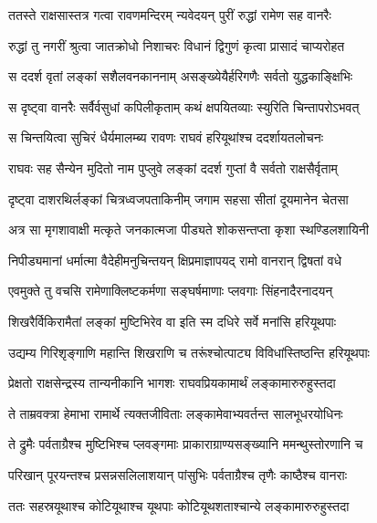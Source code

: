 
\twolineshloka
{ततस्ते राक्षसास्तत्र गत्वा रावणमन्दिरम्}
{न्यवेदयन् पुरीं रुद्धां रामेण सह वानरैः} %

\twolineshloka
{रुद्धां तु नगरीं श्रुत्वा जातक्रोधो निशाचरः}
{विधानं द्विगुणं कृत्वा प्रासादं चाप्यरोहत} %

\twolineshloka
{स ददर्श वृतां लङ्कां सशैलवनकाननाम्}
{असङ्ख्येयैर्हरिगणैः सर्वतो युद्धकाङ्क्षिभिः} %

\twolineshloka
{स दृष्ट्वा वानरैः सर्वैर्वसुधां कपिलीकृताम्}
{कथं क्षपयितव्याः स्युरिति चिन्तापरोऽभवत्} %

\twolineshloka
{स चिन्तयित्वा सुचिरं धैर्यमालम्ब्य रावणः}
{राघवं हरियूथांश्च ददर्शायतलोचनः} %

\twolineshloka
{राघवः सह सैन्येन मुदितो नाम पुप्लुवे}
{लङ्कां ददर्श गुप्तां वै सर्वतो राक्षसैर्वृताम्} %

\twolineshloka
{दृष्ट्वा दाशरथिर्लङ्कां चित्रध्वजपताकिनीम्}
{जगाम सहसा सीतां दूयमानेन चेतसा} %

\twolineshloka
{अत्र सा मृगशावाक्षी मत्कृते जनकात्मजा}
{पीड्यते शोकसन्तप्ता कृशा स्थण्डिलशायिनी} %

\twolineshloka
{निपीड्यमानां धर्मात्मा वैदेहीमनुचिन्तयन्}
{क्षिप्रमाज्ञापयद् रामो वानरान् द्विषतां वधे} %

\twolineshloka
{एवमुक्ते तु वचसि रामेणाक्लिष्टकर्मणा}
{सङ्घर्षमाणाः प्लवगाः सिंहनादैरनादयन्} %

\twolineshloka
{शिखरैर्विकिरामैतां लङ्कां मुष्टिभिरेव वा}
{इति स्म दधिरे सर्वे मनांसि हरियूथपाः} %

\twolineshloka
{उद्यम्य गिरिशृङ्गाणि महान्ति शिखराणि च}
{तरूंश्चोत्पाट्य विविधांस्तिष्ठन्ति हरियूथपाः} %

\twolineshloka
{प्रेक्षतो राक्षसेन्द्रस्य तान्यनीकानि भागशः}
{राघवप्रियकामार्थं लङ्कामारुरुहुस्तदा} %

\twolineshloka
{ते ताम्रवक्त्रा हेमाभा रामार्थे त्यक्तजीविताः}
{लङ्कामेवाभ्यवर्तन्त सालभूधरयोधिनः} %

\twolineshloka
{ते द्रुमैः पर्वताग्रैश्च मुष्टिभिश्च प्लवङ्गमाः}
{प्राकाराग्राण्यसङ्ख्यानि ममन्थुस्तोरणानि च} %

\twolineshloka
{परिखान् पूरयन्तश्च प्रसन्नसलिलाशयान्}
{पांसुभिः पर्वताग्रैश्च तृणैः काष्ठैश्च वानराः} %

\twolineshloka
{ततः सहस्रयूथाश्च कोटियूथाश्च यूथपाः}
{कोटियूथशताश्चान्ये लङ्कामारुरुहुस्तदा} %

